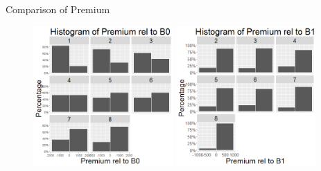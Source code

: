 \documentclass[xcolor=dvipsnames,12pt]{beamer}
\theoremstyle{definition}
\begin{document}
\begin{frame}{Comparison of Premium}
\begin{figure}
\graphicspath{ {../../0_relative_to_bundle_0/} }
\includegraphics[width=0.475\textwidth]{3_z_histogram_of_prem_rel_to_b0_2_col_in_num_of_acc_relerent_bundle_index}
\hfill
\graphicspath{ {../../1_relative_to_bundle_1/} }
\includegraphics[width=0.475\textwidth]{3_z_histogram_of_prem_rel_to_bundle_1_2_col_in_different_bundle_index}
\end{figure}
\end{frame}
\end{document}

